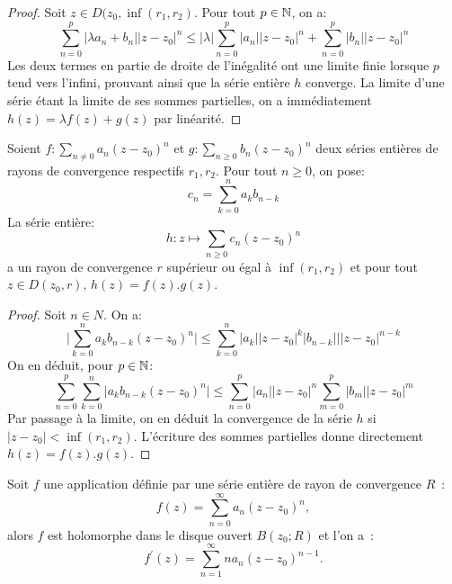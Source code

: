 \begin{proof}
Soit $z \in D(z_0, \inf(r_1,r_2)$. Pour tout $p \in {\mathbb N}$, on a:
\[
\sum_{n=0}^p \lvert \lambda a_n + b_n \lvert |z-z_0|^n \leq  \lvert \lambda\rvert  \sum_{n=0}^p \lvert a_n \lvert |z-z_0|^n + \sum_{n=0}^p \lvert b_n \lvert |z-z_0|^n 
\]
Les deux termes en partie de droite de l'inégalité ont une limite finie lorsque $p$ tend vers l'infini, prouvant ainsi que la série entière $h$ converge. La limite d'une série étant la limite de ses sommes partielles, on a immédiatement $h(z) = \lambda f(z) + g(z)$ par linéarité.
\end{proof}
\begin{fprop}
Soient $f \colon \sum_{n \neq 0}a_n(z-z_0)^n$ et $g \colon \sum_{n \geq 0} b_n (z-z_0)^n$ deux séries entières de rayons de convergence respectifs $r_1,r_2$. 
Pour tout $n \geq 0$, on pose:
\[
c_n = \sum_{k=0}^n a_k b_{n-k}
\]
La série entière:
\[
h \colon z \mapsto \sum_{n \geq 0} c_n (z-z_0)^n
\]
a un rayon de convergence $r$ supérieur ou égal à $\inf(r_1,r_2)$ et pour tout $z \in D(z_0,r), \, h(z) = f(z).g(z)$.
\end{fprop}
\begin{proof}
Soit $n \in N$. On a:
\[
\lvert \sum_{k=0}^n a_k b_{n-k} (z-z_0)^n\rvert \leq \sum_{k=0}^n \lvert a_k\rvert\lvert z- z_0\rvert^k \lvert b_{n-k}\rvert \lvert|z-z_0|^{n-k}
\]
On en déduit, pour $p \in {\mathbb N}$:
\[
\sum_{n = 0}^p  \sum_{k=0}^n \lvert a_k b_{n-k} (z-z_0)^n\rvert \leq \sum_{n=0}^p |a_n| |z-z_0|^n \sum_{m=0}^p |b_m||z-z_0|^m
\]
Par passage à la limite, on en déduit la convergence de la série $h$ si $|z-z_0| < \inf(r_1,r_2)$. L'écriture des sommes partielles donne directement $h(z)=f(z).g(z)$.
\end{proof}
\begin{fthm}
Soit $f$ une application définie par une série entière de rayon de
convergence $R$~:
\begin{equation}\label{eq:serie1}
f(z) = \sum_{n =0}^\infty a_n (z-z_0)^n,
\end{equation}
alors $f$ est holomorphe dans le disque ouvert $B(z_0 ; R)$ et l'on a~:
\begin{equation}\label{eq:serie2}
f^\prime(z) = \sum_{n = 1}^\infty n a_{n} (z-z_0)^{n-1}.
\end{equation}
\end{fthm}
